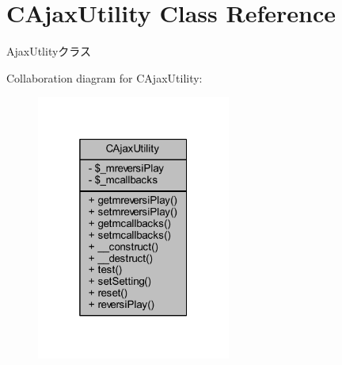 \hypertarget{class_c_ajax_utility}{}\section{C\+Ajax\+Utility Class Reference}
\label{class_c_ajax_utility}


Ajax\+Utlityクラス  




Collaboration diagram for C\+Ajax\+Utility\+:\nopagebreak
\begin{figure}[H]
\begin{center}
\leavevmode
\includegraphics[width=181pt]{class_c_ajax_utility__coll__graph}
\end{center}
\end{figure}
